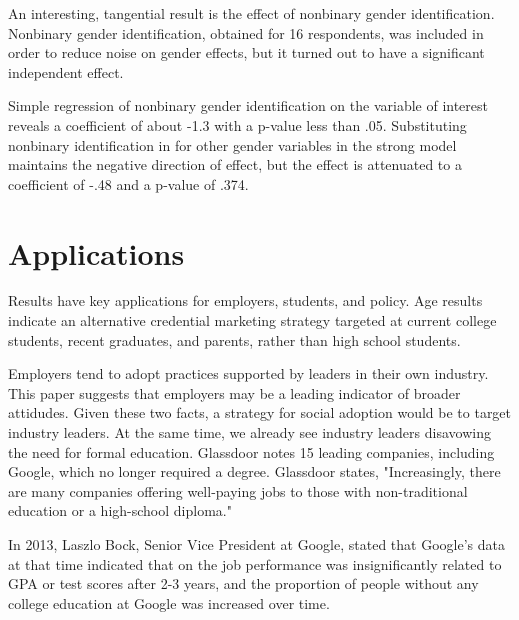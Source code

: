 \documentclass[AER]{./aea-latex-templates/AEA}
\begin{document}
        An interesting, tangential result is the effect of nonbinary gender identification.
        Nonbinary gender identification, obtained for 16 respondents, was included in order to
        reduce noise on gender effects, but it turned out to have a significant independent effect.
        
        Simple regression of nonbinary gender identification on the variable of
        interest reveals a coefficient of about -1.3 with a p-value less than .05.
        Substituting nonbinary identification in for other gender variables in the strong model
        maintains the negative direction of effect, but the effect is
        attenuated to a coefficient of -.48 and a p-value of .374.
        
        \section{Applications}
        
        Results have key applications for employers, students, and policy.
        Age results indicate an alternative credential marketing strategy targeted at
        current college students, recent graduates, and parents, rather than high school students.
        
        Employers tend to adopt practices supported by leaders in their own industry.
        This paper suggests that employers may be a leading indicator of broader attidudes.
        Given these two facts, a strategy for social adoption would be to target industry leaders.
        At the same time, we already see industry leaders disavowing the need for formal education.
        Glassdoor notes 15 leading companies, including Google, which no longer required a degree\cite{glassdoor_2018}. Glassdoor
        states, "Increasingly, there are many companies offering well-paying jobs
        to those with non-traditional education or a high-school diploma."
        
        In 2013, Laszlo Bock, Senior Vice President at Google, stated that Google’s data at that time indicated
        that on the job performance was insignificantly related to GPA or test
        scores after 2-3 years, and the proportion of people without any college
        education at Google was increased over time\cite{bryant_2013}.
        
\end{document}
